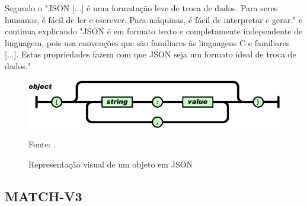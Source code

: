  
Segundo o \citeauthor{json2} "JSON [...] é uma formatação leve de troca de dados. Para seres humanos, é fácil de ler e escrever. Para máquinas, é fácil de interpretar e gerar." e continua explicando "JSON é em formato texto e completamente independente de linguagem, pois usa convenções que são familiares às linguagens C e familiares [...]. Estas propriedades fazem com que JSON seja um formato ideal de troca de dados."

\begin{figure}[!ht]
	\caption{Representação visual de um objeto em JSON}
	\begin{center}
		\includegraphics[width=15cm]{imagens/json.jpg}
	\end{center}
	\small{Fonte: \cite{json2}.}
	\label{fig:Json}
\end{figure}
 

\subsection{MATCH-V3}

